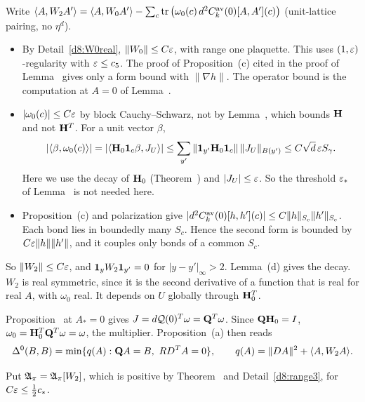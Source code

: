 \begin{detail}\label{d8:hessgamma}
\begin{step}[$W_2$ is bounded]
Write $\langle A,W_2A'\rangle=\langle A,W_0A'\rangle-\sum_c\operatorname{tr}\big(\omega_0(c)\,d^2C^{\rm av}_k(0)[A,A'](c)\big)$ (unit-lattice pairing, no $\eta^d$).
\begin{itemize}
\item By Detail~\ref{d8:W0real}, $\|W_0\|\le C\varepsilon$, with range one plaquette. This uses $(1,\varepsilon)$-regularity with $\varepsilon\le c_5$. The proof of Proposition~(c) cited in the proof of Lemma~ gives only a form bound with $\|\nabla h\|$. The operator bound is the computation at $A=0$ of Lemma~.
\item $|\omega_0(c)|\le C\varepsilon$ by block Cauchy--Schwarz, not by Lemma~, which bounds $\mathbf H$ and not $\mathbf H^T$. For a unit vector $\beta$,
\[
|\langle \beta,\omega_0(c)\rangle|=|\langle \mathbf H_0\mathbf 1_c\beta,J_U\rangle|\le\sum_{y'}\|\mathbf 1_{y'}\mathbf H_0\mathbf 1_c\|\,\|J_U\|_{B(y')}\le C\sqrt d\,\varepsilon S_\gamma .
\]
Here we use the decay of $\mathbf H_0$ (Theorem~) and $|J_U|\le\varepsilon$. So the threshold $\varepsilon_*$ of Lemma~ is not needed here.
\item Proposition~(c) and polarization give $|d^2C^{\rm av}_k(0)[h,h'](c)|\le C\|h\|_{S_c}\|h'\|_{S_c}$. Each bond lies in boundedly many $S_c$. Hence the second form is bounded by $C\varepsilon\|h\|\|h'\|$, and it couples only bonds of a common $S_c$.
\end{itemize}
So $\|W_2\|\le C\varepsilon$, and $\mathbf 1_yW_2\mathbf 1_{y'}=0$ for $|y-y'|_\infty>2$. Lemma~(d) gives the decay. $W_2$ is real symmetric, since it is the second derivative of a function that is real for real $A$, with $\omega_0$ real. It depends on $U$ globally through $\mathbf H_0^T$.
\end{step}
\begin{step}[At critical $U$]
Proposition~ at $A_*=0$ gives $J=d\mathcal Q(0)^T\omega=\mathbf Q^T\omega$. Since $\mathbf Q\mathbf H_0=I$, $\omega_0=\mathbf H_0^T\mathbf Q^T\omega=\omega$, the multiplier. Proposition~(a) then reads
\[
\Delta^0(B,B)=\min\{q(A):\bQ A=B,\ RD^TA=0\},\qquad q(A)=\|DA\|^2+\ip A{W_2A}.
\]
\end{step}
\begin{step}
Put $\mathfrak A_\pi=\mathfrak A_\pi[W_2]$, which is positive by Theorem~ and Detail~\ref{d8:range3}, for $C\varepsilon\le\frac12c_*$.

\end{step}
\end{detail}
